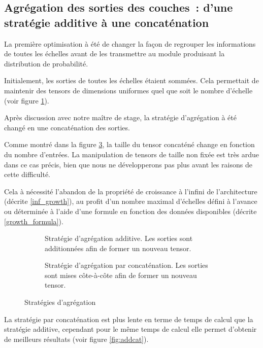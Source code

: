 \subsection[Agrégation des sorties des couches]{Agrégation des sorties des couches~: d'une stratégie additive à une concaténation}\label{subsec:addcat_}
La première optimisation à été de changer la façon de regrouper les informations de toutes les \og échelles\fg{} avant de les transmettre au module produisant la distribution de probabilité.

Initialement, les sorties de toutes les \og échelles\fg{} étaient sommées. Cela permettait de maintenir des \glspl{tensor} de dimensions uniformes quel que soit le nombre d'\og échelle\fg{} (voir figure \ref{fig:add}).

Après discussion avec notre maître de stage, la stratégie d'agrégation à été changé en une concaténation des sorties.

Comme montré dans la figure \ref{fig:cat}, la taille du \gls{tensor} concaténé change en fonction du nombre d'entrées.
La manipulation de \glspl{tensor} de taille non fixée est très ardue dans ce cas précis, bien que nous ne développerons pas plus avant les raisons de cette difficulté.

Cela à nécessité l'abandon de la propriété de croissance à l'infini de l'architecture (décrite \autoref{inf_growth}), au profit d'un nombre maximal d'échelles défini à l'avance ou déterminée à l'aide d'une formule en fonction des données disponibles (décrite \mbox{\autoref{growth_formula}}).

\begin{figure}[ht]
	\begin{subfigure}{0.45\textwidth}
		\centering
		\scalebox{1}{}
		\caption[Stratégie d'agrégation additive]{Stratégie d'agrégation additive. Les sorties sont additionnées afin de former un nouveau \gls{tensor}.}\label{fig:add}
	\end{subfigure}
	\begin{subfigure}{0.45\textwidth}
		\centering
		\scalebox{1}{}
		\caption[Stratégie d'agrégation par concaténation]{Stratégie d'agrégation par concaténation. Les sorties sont mises côte-à-côte afin de former un nouveau \gls{tensor}.}\label{fig:cat}
	\end{subfigure} 
	\caption{Stratégies d'agrégation}
\end{figure}

La stratégie par concaténation est plus lente en terme de temps de calcul que la stratégie additive, cependant pour le même temps de calcul elle permet d'obtenir de meilleurs résultats (voir figure \ref{fig:addcat}).


